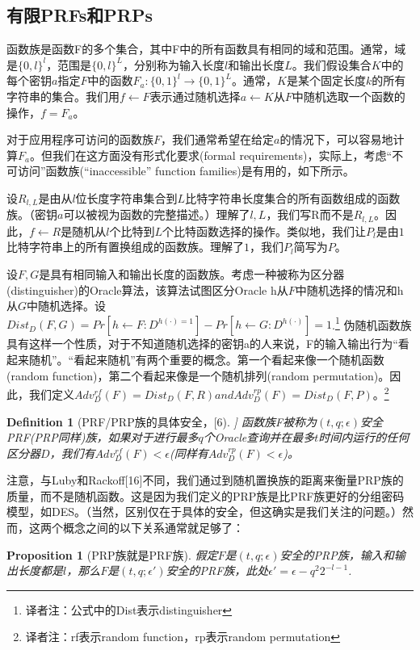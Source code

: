 \documentclass[]{article}
\newtheorem{definition}{Definition}
\newtheorem{proposition}{Proposition}
\begin{document}
\subsection{有限PRFs和PRPs}
函数族是函数F的多个集合，其中F中的所有函数具有相同的域和范围。通常，域是$\{0,l\}^l$，范围是$\{0,l\}^L$，分别称为输入长度$l$和输出长度$L$。我们假设集合$K$中的每个密钥$a$指定$F$中的函数$F_a:\{0,1\}^l \rightarrow \{0,1\}^L$。通常，$K$是某个固定长度$k$的所有字符串的集合。我们用$f\leftarrow F$表示通过随机选择$a\leftarrow K$从$F$中随机选取一个函数的操作，$f=F_a$。

对于应用程序可访问的函数族$F$，我们通常希望在给定$a$的情况下，可以容易地计算$F_a$。但我们在这方面没有形式化要求(formal requirements)，实际上，考虑“不可访问”函数族(“inaccessible” function families)是有用的，如下所示。

设$R_{l,L}$是由从$l$位长度字符串集合到$L$比特字符串长度集合的所有函数组成的函数族。（密钥$a$可以被视为函数的完整描述。）理解了$l,L$，我们写R而不是$R_{l,L}$。因此，$f\leftarrow R$是随机从$l$个比特到$L$个比特函数选择的操作。类似地，我们让$P_l$是由$1$比特字符串上的所有置换组成的函数族。理解了$1$，我们$P_l$简写为$P$。

设$F,G$是具有相同输入和输出长度的函数族。考虑一种被称为区分器(distinguisher)的Oracle算法，该算法试图区分Oracle h从$F$中随机选择的情况和h从$G$中随机选择。设$Dist_D(F,G)=Pr[h\leftarrow F:D^{h(\cdot)=1}]-Pr[h\leftarrow G:D^{h(\cdot)}]=1$.\footnote{译者注：公式中的Dist表示distinguisher}
伪随机函数族具有这样一个性质，对于不知道随机选择的密钥a的人来说，F的输入输出行为“看起来随机”。“看起来随机”有两个重要的概念。第一个看起来像一个随机函数(random function)，第二个看起来像是一个随机排列(random permutation)。因此，我们定义$Adv_D^{rf}(F)=Dist_D(F,R)  and  Adv_D^{rp}(F)=Dist_D(F,P)$。\footnote{译者注：rf表示random function，rp表示random permutation}


\begin{definition}[PRF/PRP族的具体安全，[6]]
	函数族F被称为$(t,q;\epsilon)$安全PRF(PRP同样)族，如果对于进行最多$q$个Oracle查询并在最多$t$时间内运行的任何区分器$D$，我们有$Adv_D^{rf}(F)<\epsilon$(同样有$Adv_D^{rp}(F)<\epsilon$)。
\end{definition}

注意，与Luby和Rackoff[16]不同，我们通过到随机置换族的距离来衡量PRP族的质量，而不是随机函数。这是因为我们定义的PRP族是比PRF族更好的分组密码模型，如DES。（当然，区别仅在于具体的安全，但这确实是我们关注的问题。）然而，这两个概念之间的以下关系通常就足够了：

\begin{proposition}[PRP族就是PRF族]\label{proPRP_PRF}
	假定$F$是$(t,q;\epsilon)$安全的PRP族，输入和输出长度都是$l$，那么$F$是$(t,q;\epsilon')$安全的PRF族，此处$\epsilon' =\epsilon -q^2 2^{-l-1}$.
\end{proposition}
\end{document}
